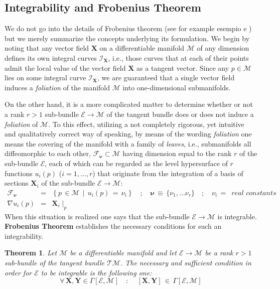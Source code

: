 \documentclass[10pt,a4paper]{article}
\newtheorem{teorema}{Theorem}[section]
\begin{document}
\subsection{Integrability and Frobenius Theorem}
We do not go into the details of Frobenius theorem (see for example
esempio \cite{arnoldometodica} e \cite{contatoregeiges}) but we merely summarize the concepts underlying its formulation.
We begin by noting that any vector field
$\mathbf{X}$  on a differentiable manifold $\mathcal{M}$ of any dimension defines its own integral curves
$\mathcal{I}_\mathbf{X}$, i.e., those curves that at each of their points admit the local value of the vector field $\mathbf{X}$  as a tangent vector.
Since any $p\in
\mathcal{M}$ lies on some integral curve
$\mathcal{I}_\mathbf{X}$, we are guaranteed that a single vector field induces a \textit{foliation} of the manifold
$\mathcal{M}$ into  one-dimensional submanifolds.
\par
On the other hand, it is a more complicated matter to determine whether or not a rank $r > 1$ sub-bundle
$\mathcal{E} \longrightarrow \mathcal{M}$  of the tangent bundle does or does not  induce a \textit{foliation} of $\mathcal{M}$. To this effect, utilizing a not completely rigorous, yet intuitive and qualitatively correct way of speaking, by means of the wording
\textit{foliation} one means the covering of the manifold with a family of
\textit{leaves}, i.e., submanifolds all diffeomorphic to each other, $\mathcal{F}_{\pmb{\nu}} \subset
\mathcal{M}$ having dimension equal to the rank $r$ of the sub-bundle
$\mathcal{E}$, each of which can be regarded as the level hypersurface
of $r$ functions $u_i(p)$ ($i=1,\dots,r$)
that originate from the integration of a basis of sections
$\mathbf{X}_i$ of the sub-bundle $\mathcal{E} \longrightarrow
\mathcal{M}$:
\begin{eqnarray}\label{sfogliatellanapoletana}
   \mathcal{F}_{\pmb{\nu}} & = & \left\{p \, \in \mathcal{M} \,
    \mid \, u_i(p) \, = \,\nu_i \right\} \quad ; \quad \pmb{\nu}\,
    \equiv\, \{\nu_1, \dots \nu_r\} \quad ; \quad \nu_i\, = \,
    \textit{ real constants}\nonumber\\
    \nabla u_i(p) &=& \mathbf{X}_i\mid_p
\end{eqnarray}
When this situation is realized one says that the sub-bundle
$\mathcal{E} \longrightarrow \mathcal{M}$  is integrable.
\textbf{ Frobenius Theorem} establishes the necessary conditions
for such an integrability.
\begin{teorema}\label{frobenico}Let $\mathcal{M}$ be a differentiable manifold  and let $\mathcal{E}
\longrightarrow \mathcal{M}$ be a rank $r> 1$ sub-bundle of the tangent bundle $\mathcal{TM}$.
The necessary and sufficient condition in order for
$\mathcal{E}$ to be  integrable is the following one:
\begin{equation}\label{frobeniata}
    \forall\, \mathbf{X},\mathbf{Y}  \in  \Gamma[\mathcal{E},\mathcal{M}] \quad :
    \quad
    \, \left[\mathbf{X},\mathbf{Y} \right] \, \in \, \Gamma[\mathcal{E},\mathcal{M}]
\end{equation}
\end{teorema}
\end{document}
